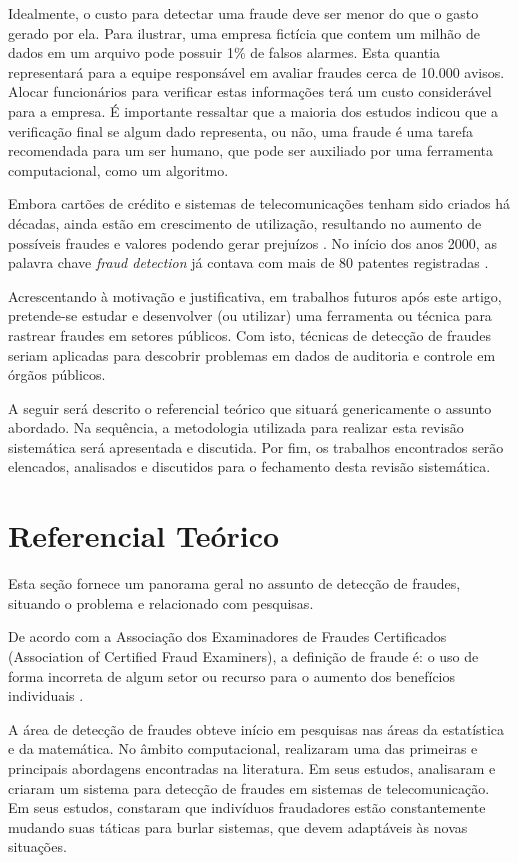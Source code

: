 \documentclass[smallextended]{svjour3}
\begin{document}
Idealmente, o custo para detectar uma fraude deve ser menor do que o gasto gerado por ela. Para ilustrar, uma empresa fictícia que contem um milhão de dados em um arquivo pode possuir 1\% de falsos alarmes. Esta quantia representará para a equipe responsável em avaliar fraudes cerca de 10.000 avisos. Alocar funcionários para verificar estas informações terá um custo considerável para a empresa. É importante ressaltar que a maioria dos estudos indicou que a verificação final se algum dado representa, ou não, uma fraude é uma tarefa recomendada para um ser humano, que pode ser auxiliado por uma ferramenta computacional, como um algoritmo. 

Embora cartões de crédito e sistemas de telecomunicações tenham sido criados há décadas, ainda estão em crescimento de utilização, resultando no aumento de possíveis fraudes e valores podendo gerar prejuízos \citep{Abdallah2016}. No início dos anos 2000, as palavra chave \emph{fraud detection} já contava com mais de 80 patentes registradas \citep{Bolton2002}.

Acrescentando à motivação e justificativa, em trabalhos futuros após este artigo, pretende-se estudar e desenvolver (ou utilizar) uma ferramenta ou técnica para rastrear fraudes em setores públicos. Com isto, técnicas de detecção de fraudes seriam aplicadas para descobrir problemas em dados de auditoria e controle em órgãos públicos.

A seguir será descrito o referencial teórico que situará genericamente o assunto abordado. Na sequência, a metodologia utilizada para realizar esta revisão sistemática será apresentada e discutida. Por fim, os trabalhos encontrados serão elencados, analisados e discutidos para o fechamento desta revisão sistemática.

\section{Referencial Teórico}
\label{sec:2}

Esta seção fornece um panorama geral no assunto de detecção de fraudes, situando o problema e relacionado com pesquisas.

De acordo com a Associação dos Examinadores de Fraudes Certificados (Association of Certified Fraud Examiners), a definição de fraude é: o uso de forma incorreta de algum setor ou recurso para o aumento dos benefícios individuais \citep{Abdallah2016}.

A área de detecção de fraudes obteve início em pesquisas nas áreas da estatística e da matemática. No âmbito computacional, \cite{Fawcett1997} realizaram uma das primeiras e principais abordagens encontradas na literatura. Em seus estudos, analisaram e criaram um sistema para detecção de fraudes em sistemas de telecomunicação. Em seus estudos, constaram que indivíduos fraudadores estão constantemente mudando suas táticas para burlar sistemas, que devem adaptáveis às novas situações.
\end{document}
